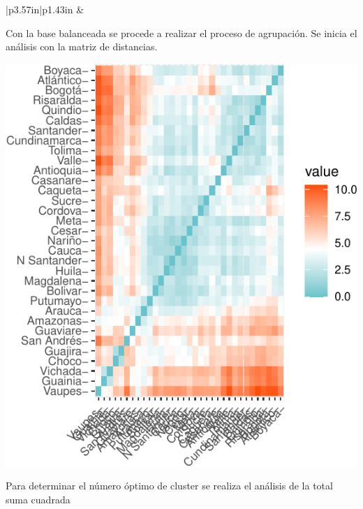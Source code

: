 \begin{longtable}[c]{|p{3.57in}|p{1.43in}}
 &  \\

\noalign{\global\setlength{\arrayrulewidth}{1pt}}

\end{longtable}

Con la base balanceada se procede a realizar el proceso de agrupación.
Se inicia el análisis con la matriz de distancias.

\includegraphics{Anexo_Cluster_files/figure-latex/unnamed-chunk-3-1.pdf}

Para determinar el número óptimo de cluster se realiza el análisis de la
total suma cuadrada

